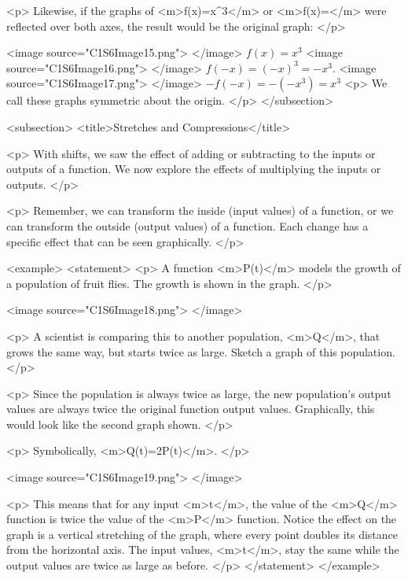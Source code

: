         <p>
            Likewise, if the graphs of <m>f(x)=x^{3}</m> or <m>f(x)=</m> were reflected over both axes, the result would be the original graph:
        </p>

        <image source="C1S6Image15.png">
        </image>
        $f(x)=x^{3}$
        <image source="C1S6Image16.png">
        </image>
        $f(-x)=(-x)^{3}=-x^{3}$.
        <image source="C1S6Image17.png">
        </image>
        $-f(-x)=-(-x^{3})=x^{3}$
        <p>
            We call these graphs symmetric about the origin.
        </p>
    </subsection>


    <subsection>
        <title>Stretches and Compressions</title>

        <p>
            With shifts, we saw the effect of adding or subtracting to the inputs or outputs of a function.
            We now explore the effects of multiplying the inputs or outputs.
        </p>

        <p>
            Remember, we can transform the inside (input values) of a function, or we can transform the outside (output values) of a function.
            Each change has a specific effect that can be seen graphically.
        </p>

        <example>
            <statement>
                <p>
                    A function <m>P(t)</m> models the growth of a population of fruit flies.
                    The growth is shown in the graph.
                </p>

                <image source="C1S6Image18.png">
                </image>

                <p>
                    A scientist is comparing this to another population, <m>Q</m>, that grows the same way, but starts twice as large.
                    Sketch a graph of this population.
                </p>

                <p>
                    Since the population is always twice as large, the new population’s output values are always twice the original function output values.
                    Graphically, this would look like the second graph shown.
                </p>

                <p>
                    Symbolically, <m>Q(t)=2P(t)</m>.
                </p>

                <image source="C1S6Image19.png">
                </image>

                <p>
                    This means that for any input <m>t</m>, the value of the <m>Q</m> function is twice the value of the <m>P</m> function.
                    Notice the effect on the graph is a vertical stretching of the graph, where every point doubles its distance from the horizontal axis.
                    The input values, <m>t</m>, stay the same while the output values are twice as large as before.
                </p>
            </statement>
        </example>

